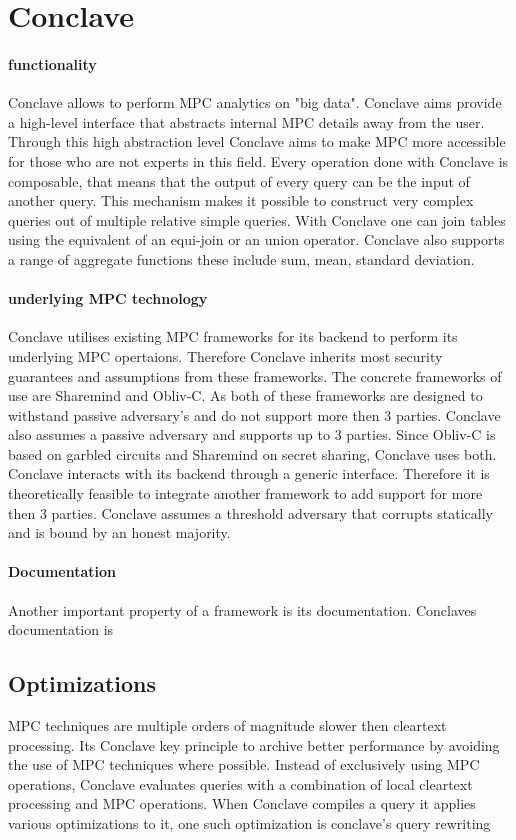 \section{Conclave}

\paragraph {functionality}
Conclave \cite{10.1145/3302424.3303982} allows to perform MPC analytics on "big data". Conclave aims provide a high-level interface that abstracts internal MPC details away from the user. Through this high abstraction level Conclave aims to make MPC more accessible for those who are not experts in this field.  Every operation done with Conclave is composable, that means that the output of every query can be the input of another query. This mechanism makes it possible to construct very complex queries out of multiple relative simple queries.  With Conclave one can join tables using the equivalent of an equi-join or an union operator. Conclave also supports a range of aggregate functions these include sum, mean, standard deviation. 

\paragraph{underlying MPC technology}
Conclave utilises existing MPC frameworks for its backend to perform its underlying MPC opertaions. Therefore Conclave inherits most security guarantees and assumptions from these frameworks. The concrete frameworks of use are Sharemind and Obliv-C. As both of these frameworks are designed to withstand passive adversary's and do not support more then 3 parties. Conclave also assumes a passive adversary and supports up to 3 parties.
Since Obliv-C is based on garbled circuits and Sharemind on secret sharing, Conclave uses both. Conclave interacts with its backend through a generic interface. Therefore it is theoretically feasible to integrate another framework to add support for more then 3 parties. Conclave assumes a threshold adversary that corrupts statically and is bound by an honest majority.

\paragraph{Documentation}
Another important property of a framework is its documentation. Conclaves documentation is 


\subsection{Optimizations}
MPC techniques are multiple orders of magnitude slower then cleartext processing. Its Conclave key principle to archive better performance by avoiding the use of MPC techniques where possible. Instead of exclusively using MPC operations, Conclave evaluates queries with a combination of local cleartext processing and MPC operations. When Conclave compiles a query it applies various optimizations to it, one such optimization is conclave's query rewriting 
